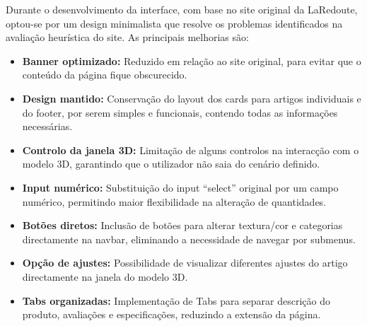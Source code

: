 \documentclass[a4paper,12pt]{article}
\begin{document}
Durante o desenvolvimento da interface, com base no site original da LaRedoute, optou-se por um design minimalista que resolve os problemas identificados na avaliação heurística do site. As principais melhorias são:

\begin{itemize}
    \item \textbf{Banner optimizado:} Reduzido em relação ao site original, para evitar que o conteúdo da página fique obscurecido.
    \item \textbf{Design mantido:} Conservação do layout dos cards para artigos individuais e do footer, por serem simples e funcionais, contendo todas as informações necessárias.
    \item \textbf{Controlo da janela 3D:} Limitação de alguns controlos na interacção com o modelo 3D, garantindo que o utilizador não saia do cenário definido.
    \item \textbf{Input numérico:} Substituição do input “select” original por um campo numérico, permitindo maior flexibilidade na alteração de quantidades.
    \item \textbf{Botões diretos:} Inclusão de botões para alterar textura/cor e categorias directamente na navbar, eliminando a necessidade de navegar por submenus.
    \item \textbf{Opção de ajustes:} Possibilidade de visualizar diferentes ajustes do artigo directamente na janela do modelo 3D.
    \item \textbf{Tabs organizadas:} Implementação de Tabs para separar descrição do produto, avaliações e especificações, reduzindo a extensão da página.
\end{itemize}
\end{document}
